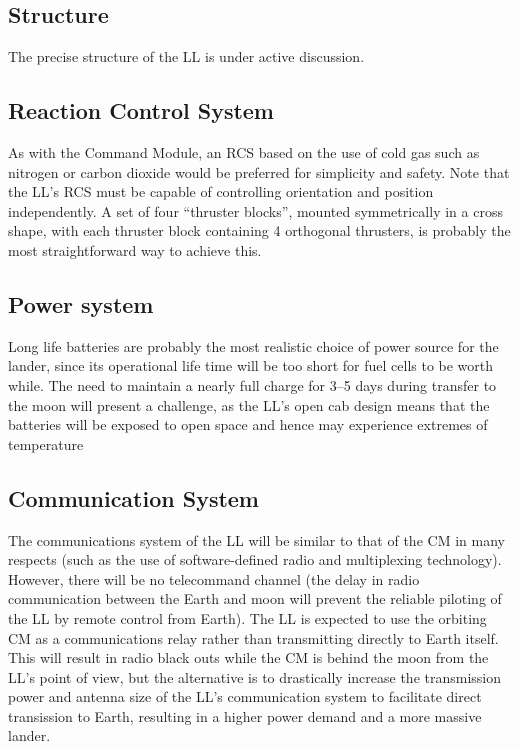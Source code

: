 \documentclass{report}
\begin{document}
\subsection{Structure}

The precise structure of the LL is under active discussion.

\subsection{Reaction Control System}

As with the Command Module, an RCS based on the use of cold gas such as nitrogen or carbon dioxide would be preferred for simplicity and safety.  Note that the LL's RCS must be capable of controlling orientation and position independently.  A set of four ``thruster blocks'', mounted symmetrically in a cross shape, with each thruster block containing 4 orthogonal thrusters, is probably the most straightforward way to achieve this.

\subsection{Power system}

Long life batteries are probably the most realistic choice of power source for the lander, since its operational life time will be too short for fuel cells to be worth while.  The need to maintain a nearly full charge for 3--5 days during transfer to the moon will present a challenge, as the LL's open cab design means that the batteries will be exposed to open space and hence may experience extremes of temperature

\subsection{Communication System}

The communications system of the LL will be similar to that of the CM in many respects (such as the use of software-defined radio and multiplexing technology).  However, there will be no telecommand channel (the delay in radio communication between the Earth and moon will prevent the reliable piloting of the LL by remote control from Earth).  The LL is expected to use the orbiting CM as a communications relay rather than transmitting directly to Earth itself.  This will result in radio black outs while the CM is behind the moon from the LL's point of view, but the alternative is to drastically increase the transmission power and antenna size of the LL's communication system to facilitate direct transission to Earth, resulting in a higher power demand and a more massive lander.
\end{document}
